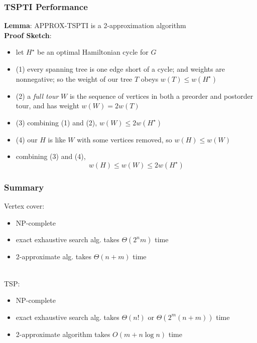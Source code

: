 \documentclass{beamer}
\newcommand{\stanza}{ \\~\ }
\begin{document}
\begin{frame} \frametitle{TSPTI Performance}
\textbf{Lemma}: APPROX-TSPTI is a 2-approximation algorithm \\
\textbf{Proof Sketch}:
\begin{itemize}
  \item let $H^\star$ be an optimal Hamiltonian cycle for $G$
  \item (1) every spanning tree is one edge short of a cycle; and weights are nonnegative;
    so the weight of our tree $T$ obeys $w(T) \leq w(H^\star)$
  \item (2) a \emph{full tour} $W$ is the sequence of vertices in both a preorder and postorder
    tour, and has weight $w(W) = 2 w(T)$
  \item (3) combining (1) and (2), $w(W) \leq 2 w(H^\star)$
  \item (4) our $H$ is like $W$ with some vertices removed, so $w(H) \leq w(W)$
  \item combining (3) and (4),
    \[ w(H) \leq w(W) \leq 2 w(H^\star) \]
\end{itemize}
\end{frame}

\begin{frame} \frametitle{Summary}
Vertex cover:
\begin{itemize}
  \item NP-complete
  \item exact exhaustive search alg. takes $\Theta(2^n m)$ time
  \item 2-approximate alg. takes $\Theta(n+m)$ time \stanza
\end{itemize}

TSP:
\begin{itemize}
  \item NP-complete
  \item exact exhaustive search alg. takes $\Theta(n!)$ or $\Theta(2^m(n+m))$ time
  \item 2-approximate algorithm takes $O(m + n \log n)$ time
\end{itemize}
\end{frame}
\end{document}
